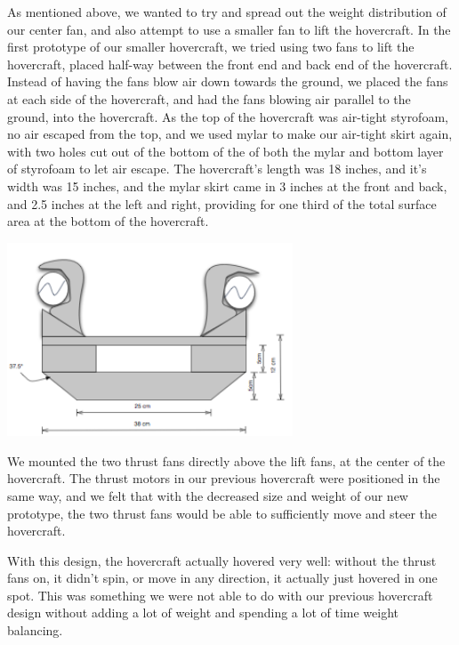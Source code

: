 As mentioned above, we wanted to try and spread
out the weight distribution of our center fan, and also attempt to use a smaller fan to lift the hovercraft. In the first
prototype of our smaller hovercraft, we tried using two fans to lift the hovercraft, placed half-way between the front end
and back end of the hovercraft. Instead of having the fans blow air down towards the ground, we placed the fans at each side
of the hovercraft, and had the fans blowing air parallel to the ground, into the hovercraft. As the top of the hovercraft was
air-tight styrofoam, no air escaped from the top, and we used mylar to make our air-tight skirt again, with two holes cut out
of the bottom of the of both the mylar and bottom layer of styrofoam to let air escape. The hovercraft's length was 18 inches,
and it's width was 15 inches, and the mylar skirt came in 3 inches at the front and back, and 2.5 inches at the left and right,
providing for one third of the total surface area at the bottom of the hovercraft.

\begin{center}
  \includegraphics[width=85mm]{imageSources/Front2.png}
\end{center}
\label{Front2}

We mounted the two thrust fans directly above the lift fans, at the center of the hovercraft. The thrust motors in our previous
hovercraft were positioned in the same way, and we felt that with the decreased size and weight of our new prototype, the 
two thrust fans would be able to sufficiently move and steer the hovercraft.

With this design, the hovercraft actually hovered very well: without the thrust fans on, it didn't spin, or move in 
any direction, it actually just hovered in one spot. This was something we were not able to do with our previous hovercraft design 
without adding a lot of weight and spending a lot of time weight balancing.

